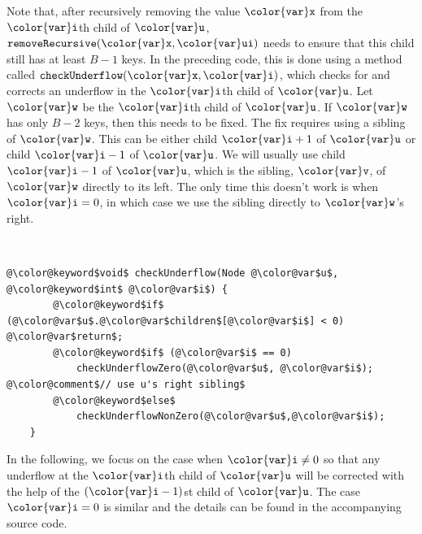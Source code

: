 \documentclass[10pt]{book}
\theoremstyle{plain}
\theoremstyle{definition}
\begin{document}
Note that, after recursively removing the value \ensuremath{\mathtt{{\color{var}x}}} from the \ensuremath{\mathtt{{\color{var}i}}}th child of \ensuremath{\mathtt{{\color{var}u}}},
\ensuremath{\mathtt{removeRecursive({\color{var}x},{\color{var}ui})}} needs to ensure that this child still has at
least $B-1$ keys.  In the preceding code, this is done using a
method called \ensuremath{\mathtt{checkUnderflow({\color{var}x},{\color{var}i})}}, which checks for and corrects an
underflow in the \ensuremath{\mathtt{{\color{var}i}}}th child of \ensuremath{\mathtt{{\color{var}u}}}.  Let \ensuremath{\mathtt{{\color{var}w}}} be the \ensuremath{\mathtt{{\color{var}i}}}th child of \ensuremath{\mathtt{{\color{var}u}}}.
If \ensuremath{\mathtt{{\color{var}w}}} has only $B-2$ keys, then this needs to be fixed.  The fix
requires using a sibling of \ensuremath{\mathtt{{\color{var}w}}}.  This can be either child $\ensuremath{\mathtt{{\color{var}i}}}+1$ of
\ensuremath{\mathtt{{\color{var}u}}} or child $\ensuremath{\mathtt{{\color{var}i}}}-1$ of \ensuremath{\mathtt{{\color{var}u}}}.  We will usually use child $\ensuremath{\mathtt{{\color{var}i}}}-1$ of \ensuremath{\mathtt{{\color{var}u}}},
which is the sibling, \ensuremath{\mathtt{{\color{var}v}}}, of \ensuremath{\mathtt{{\color{var}w}}} directly to its left.  The only time
this doesn't work is when $\ensuremath{\mathtt{{\color{var}i}}}=0$, in which case we use the sibling
directly to \ensuremath{\mathtt{{\color{var}w}}}'s right.


 \ \vspace{.5ex}\begin{Verbatim}[gobble=1,tabsize=2,frame=single,framerule=1.2pt,commandchars=\\@\$,label=\texttt{BTree},labelposition=topline]
	@\color@keyword$void$ checkUnderflow(Node @\color@var$u$, @\color@keyword$int$ @\color@var$i$) {
		@\color@keyword$if$ (@\color@var$u$.@\color@var$children$[@\color@var$i$] < 0) @\color@var$return$;
		@\color@keyword$if$ (@\color@var$i$ == 0) 
			checkUnderflowZero(@\color@var$u$, @\color@var$i$); @\color@comment$// use u's right sibling$
		@\color@keyword$else$
			checkUnderflowNonZero(@\color@var$u$,@\color@var$i$);
	}
\end{Verbatim}

In the following, we focus on the case when $\ensuremath{\mathtt{{\color{var}i}}}\neq 0$ so that any
underflow at the \ensuremath{\mathtt{{\color{var}i}}}th child of \ensuremath{\mathtt{{\color{var}u}}} will be corrected with the help
of the $(\ensuremath{\mathtt{{\color{var}i}}}-1)$st child of \ensuremath{\mathtt{{\color{var}u}}}.  The case $\ensuremath{\mathtt{{\color{var}i}}}=0$ is similar and the
details can be found in the accompanying source code.
\end{document}
